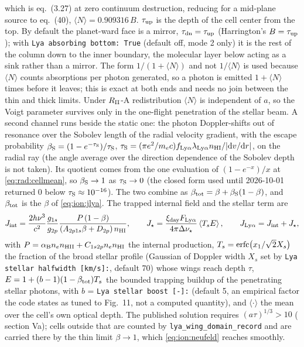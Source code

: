 which is \citet{Neufeld1990} eq.~(3.27) at zero continuum
destruction, reducing for a mid-plane source to \citet{Harrington1973}
eq.~(40), $\langle N\rangle = 0.909316\,B$. $\tau_{\rm up}$ is the depth of
the cell center from the top. By default the planet-ward face is a mirror,
$\tau_{\rm dn}=\tau_{\rm up}$ (Harrington's $B=\tau_{\rm up}$); with
\texttt{Lya absorbing bottom: True} (default off, mode 2 only) it is the rest
of the column down to the inner boundary, the molecular layer below acting as
a sink rather than a mirror. The form $1/(1+\langle N\rangle)$ and not $1/\langle N\rangle$ is used
because $\langle N\rangle$ counts absorptions per photon generated, so a
photon is emitted $1+\langle N\rangle$ times before it leaves; this is exact
at both ends and needs no join between the thin and thick limits. Under
$R_{\rm II}$-A redistribution $\langle N\rangle$ is independent of $a$, so
the Voigt parameter survives only in the one-flight penetration of the
stellar beam. A second channel runs beside the static one: the photon
Doppler-shifts out of resonance over the Sobolev length of the radial
velocity gradient, with the escape probability
$\beta_{\rm S} = (1-e^{-\tau_{\rm S}})/\tau_{\rm S}$,
$\tau_{\rm S} = (\pi e^{2}/m_ec)f_{\rm Ly\alpha}\lambda_{\rm Ly\alpha}
n_{\rm HI}/|{\rm d}v/{\rm d}r|$, on the radial ray (the angle average over
the direction dependence of the Sobolev depth is not taken). Its quotient
comes from the one evaluation of $(1-e^{-x})/x$ at \eqref{eq:rad:cellmean},
so $\beta_{\rm S}\to1$ as $\tau_{\rm S}\to0$ (the closed form used until
2026-10-01 returned 0 below $\tau_{\rm S}\approx10^{-16}$). The two combine
as $\beta_{\rm tot} = \beta + \beta_{\rm S}(1-\beta)$, and $\beta_{\rm tot}$
is the $\beta$ of \eqref{eq:ion:jlya}. The trapped internal field and the stellar term are
\begin{equation}
J_{\rm int} = \frac{2h\nu^{3}}{c^{2}}\frac{g_{1s}}{g_{2p}}
   \frac{P\left(1-\beta\right)}{\left(A_{2p1s}\beta+D_{2p}\right)n_{\rm HI}},
\qquad
J_\star = \frac{\xi_{\rm day}F_{\rm Ly\alpha}}{4\pi\Delta\nu_\star}
          \left\langle T_s E\right\rangle,
\qquad
J_{\rm Ly\alpha} = J_{\rm int}+J_\star,
\label{eq:ion:jlya}
\end{equation}
with $P = \alpha_{\rm B}n_e n_{\rm HII} + C_{1s2p}n_e n_{\rm HI}$ the
internal production, $T_s = {\rm erfc}\!\left(x_1/\sqrt2 X_s\right)$ the
fraction of the broad stellar profile (Gaussian of Doppler width
$X_s$ set by \texttt{Lya stellar halfwidth [km/s]:}, default 70) whose wings
reach depth $\tau$, $E = 1+(b-1)(1-\beta_{\rm tot})T_s$ the bounded trapping
buildup of the penetrating stellar photons, with $b$ = \texttt{Lya stellar
boost [-]:} (default 5, an empirical factor the code states as tuned to
\citealt{Huang2023} Fig.~11, not a computed quantity), and
$\langle\cdot\rangle$ the mean over the cell's own optical depth. The published solution requires $(a\tau)^{1/3}>10$
(\citeauthor{Neufeld1990} section Va); cells outside that are counted by
\texttt{lya\_wing\_domain\_record} and are carried there by the thin limit
$\beta\to1$, which \eqref{eq:ion:neufeld} reaches smoothly.
